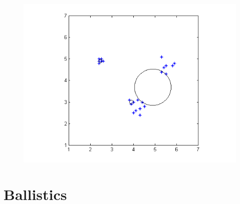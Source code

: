 \documentclass[a4paper,11pt]{article}
\begin{document}
\begin{itemize}
\begin{figure}[h!]
{    \includegraphics[width=0.5\linewidth]{lab2/emSingleSameClusterAndUnit.png}
    \label{fig5:sub4}
}
\label{fig5}
\caption{}
\end{figure}


\end{itemize}

\clearpage
\section{Ballistics}
\end{document}
